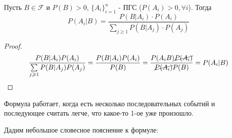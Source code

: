 \begin{definition}
	Пусть $B \in \mathcal{F}$ и $P(B) > 0$, $\{ A_i \}_{i=1}^n$ - ПГС ($P(A_i) > 0, \forall i$). Тогда
	\[ P(A_i|B) = \dfrac{P(B|A_i) \cdot P(A_i)}{\sum\limits_{j \ge 1} P(B|A_j) \cdot P(A_j)} \]
\end{definition}

\begin{proof}
	\[ \frac{P(B|A_i)P(A_i)}{\sum\limits_{j \ge 1} P(B|A_j)P(A_j)} = \frac{P(B|A_i) P(A_i)}{P(B)} = \frac{P(A_iB)\cancel{P(A_i)}}{\cancel{P(A_i)}P(B)} = P(A_i|B) \]
\end{proof}

\begin{remark}
	Формула работает, когда есть несколько последовательных событий и последующее считать легче, что какое-то 1-ое уже произошло.
\end{remark}

Дадим небольшое словесное пояснение к формуле:
\begin{figure}[H]
\end{figure}

